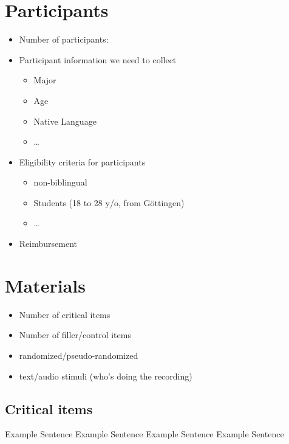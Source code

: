 \documentclass[
    numbers=noenddot,
    open=any,
    paper=a4,
    oneside,
    pagesize,
    captions=tableheading,
    bibliography=totoc,
    11pt
    ]{scrbook}
\providecommand{\tightlist}{%
    \setlength{\itemsep}{0pt}\setlength{\parskip}{0pt}}
\begin{document}
\hypertarget{participants}{%
\chapter{Participants}\label{participants}}

\begin{itemize}
\tightlist
\item
  Number of participants:
\item
  Participant information we need to collect

  \begin{itemize}
  \tightlist
  \item
    Major
  \item
    Age
  \item
    Native Language
  \item
    \ldots
  \end{itemize}
\item
  Eligibility criteria for participants

  \begin{itemize}
  \tightlist
  \item
    non-biblingual
  \item
    Students (18 to 28 y/o, from Göttingen)
  \item
    \ldots
  \end{itemize}
\item
  Reimbursement
\end{itemize}

\hypertarget{materials}{%
\chapter{Materials}\label{materials}}

\begin{itemize}
\tightlist
\item
  Number of critical items
\item
  Number of filler/control items
\item
  randomized/pseudo-randomized
\item
  text/audio stimuli (who's doing the recording)
\end{itemize}

\hypertarget{critical-items}{%
\section{Critical items}\label{critical-items}}

\begin{exe}
    \ex \begin{xlist}
        \ex Example Sentence
        \ex Example Sentence
        \ex Example Sentence
        \ex Example Sentence
    \end{xlist}
\end{exe}
\end{document}
